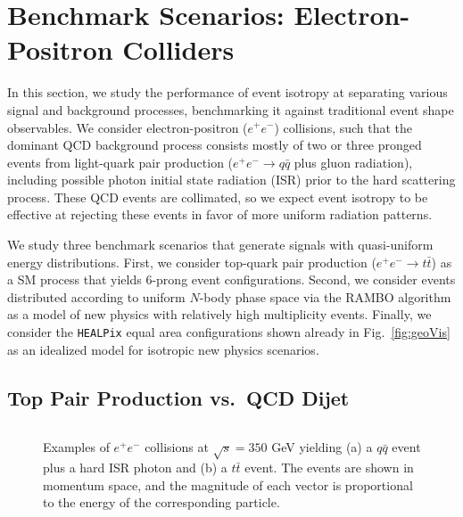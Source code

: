 \documentclass[letterpaper,11pt]{article}
\DeclareRobustCommand{\Fig}[1]{Fig.~\ref{#1}}
\begin{document}
\section{Benchmark Scenarios: Electron-Positron Colliders}
\label{sec:emdBE}


In this section, we study the performance of event isotropy at separating various signal and background processes, benchmarking it against traditional event shape observables.
%
We consider electron-positron ($e^+e^-$) collisions, such that the dominant QCD background process consists mostly of two or three pronged events from light-quark pair production ($e^+ e^- \to q\bar{q}$ plus gluon radiation), including possible photon initial state radiation (ISR) prior to the hard scattering process. 
%
These QCD events are collimated, so we expect event isotropy to be effective at rejecting these events in favor of more uniform radiation patterns. 


We study three benchmark scenarios that generate signals with quasi-uniform energy distributions.
%
First, we consider top-quark pair production ($e^+ e^- \to t\bar{t}$) as a SM process that yields 6-prong event configurations.
%
Second, we consider events distributed according to uniform $N$-body phase space via the RAMBO algorithm \cite{Kleiss:1985gy} as a model of new physics with relatively high multiplicity events. 
%
Finally, we consider the \texttt{HEALPix} equal area configurations shown already in \Fig{fig:geoVis} as an idealized model for isotropic new physics scenarios.


\subsection{Top Pair Production vs.\ QCD Dijet}
\label{subsec:top_ee}


\begin{figure}[t]
\centering
$\qquad$
          \hfill
\caption{Examples of $e^+e^-$ collisions at $\sqrt{s} = 350$ GeV yielding (a) a $q\bar{q}$ event plus a hard ISR photon and (b) a $t\bar{t}$ event.
%
The events are shown in momentum space, and the magnitude of each vector is proportional to the energy of the corresponding particle.}
%
\label{fig:eeVis}
\end{figure}
\end{document}
